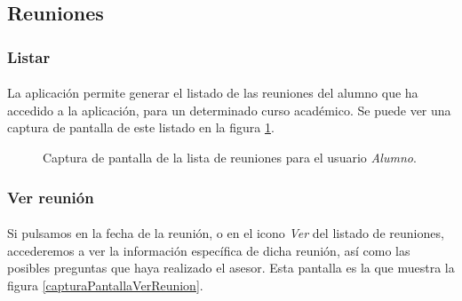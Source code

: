 \subsection{Reuniones}

  \subsubsection{Listar}

  \paragraph{}La aplicación permite generar el listado de las reuniones del
  alumno que ha accedido a la aplicación, para un determinado curso
  académico. Se puede ver una captura de pantalla de este listado en la figura
  \ref{capturaPantallaListaReuniones}.

  \begin{figure}[!ht]
    \begin{center}
      \caption{Captura de pantalla de la lista de reuniones para el usuario \textit{Alumno}.}
      \label{capturaPantallaListaReuniones}
    \end{center}
  \end{figure}

  \subsubsection{Ver reunión}

  \paragraph{}Si pulsamos en la fecha de la reunión, o en el icono \textit{Ver}
  del listado de reuniones, accederemos a ver la información específica de dicha
  reunión, así como las posibles preguntas que haya realizado el asesor. Esta
  pantalla es la que muestra la figura \ref{capturaPantallaVerReunion}.

